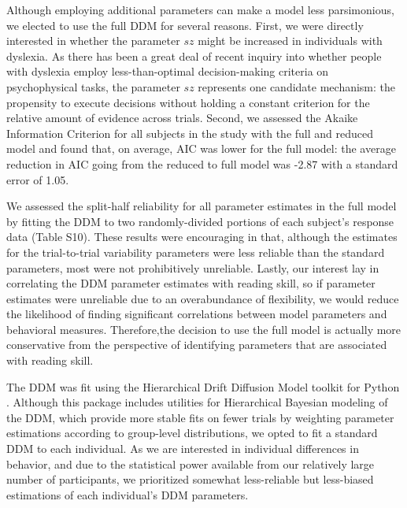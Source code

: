 \documentclass[../uwthesis.tex]{subfiles}
\begin{document}
Although employing additional parameters can make a model less parsimonious, we elected to use the full DDM for several reasons. First, we were directly interested in whether the
parameter $sz$ might be increased in individuals with dyslexia. As there has been a great deal of recent inquiry into whether people with dyslexia employ less-than-optimal decision-making
criteria on psychophysical tasks, the parameter $sz$ represents one candidate mechanism: the propensity to execute decisions without holding a constant criterion for the relative amount of
evidence across trials. Second, we assessed the Akaike Information Criterion for all subjects in the study with the full and reduced model and found that, on average, AIC was lower for the full model: the average reduction in AIC going from the reduced to full model was -2.87 with a standard error of 1.05.

We assessed the split-half reliability for all parameter estimates in the full model by fitting the DDM to two randomly-divided portions of each subject’s response data (Table S10). These results were encouraging in that, although the estimates for the trial-to-trial variability parameters
were less reliable than the standard parameters, most were not prohibitively unreliable. Lastly, our interest lay in correlating the DDM parameter estimates with reading skill, so if parameter
estimates were unreliable due to an overabundance of flexibility, we would reduce the likelihood of finding significant correlations between model parameters and behavioral measures. Therefore,the decision to use the full model is actually more conservative from the perspective of identifying
parameters that are associated with reading skill.

The DDM was fit using the Hierarchical Drift Diffusion Model toolkit for Python \cite{Wiecki2013HDDM:Python}.
Although this package includes utilities for Hierarchical Bayesian modeling of the DDM, which provide more stable fits on fewer trials by weighting parameter estimations according to group-level distributions, we opted to fit a standard DDM to each individual. As we are interested in individual differences in behavior, and due to the statistical power available from our relatively large number of participants, we prioritized somewhat less-reliable but less-biased estimations of
each individual’s DDM parameters.
\end{document}
